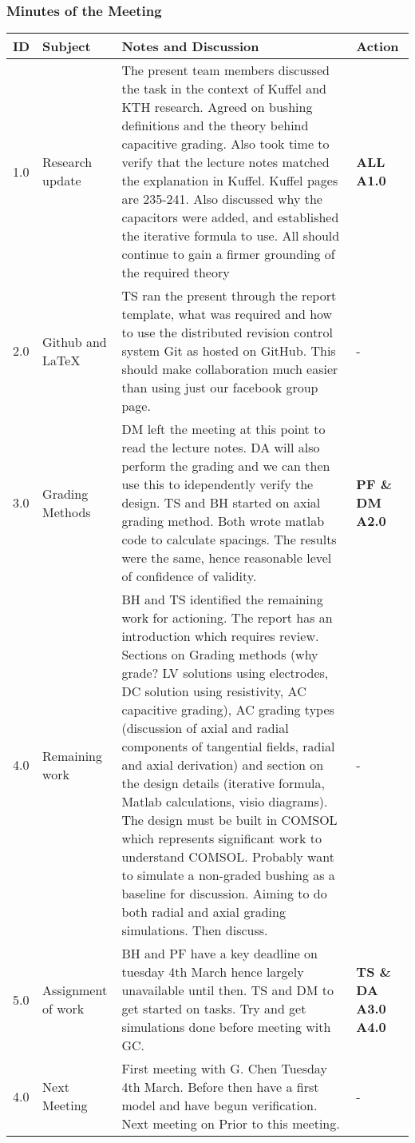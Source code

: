 \subsubsection{Minutes of the Meeting}
\begin{center}
\begin{longtable}{| p{} |>{\raggedright\arraybackslash}p{} | p{} |>{\raggedright\arraybackslash}p{}|} \hline
\textbf{ID} & \textbf{Subject} & \textbf{Notes and Discussion} & \textbf{Action} \\ \hline
\endhead
1.0	&	Research update	&	The present team members discussed the task in the context of Kuffel and KTH research. Agreed on bushing definitions and the theory behind capacitive grading. Also took time to verify that the lecture notes matched the explanation in Kuffel. Kuffel pages are 235-241. Also discussed why the capacitors were added, and established the iterative formula to use. All should continue to gain a firmer grounding of the required theory & \textbf{ALL A1.0}  	 \\ \hline
2.0	&	Github and \LaTeX	&	TS ran the present through the report template, what was required and how to use the distributed revision control system Git as hosted on GitHub. This should make collaboration much easier than using just our facebook group page. 	& -	 \\ \hline
3.0 	& 	Grading Methods &	DM left the meeting at this point to read the lecture notes. DA will also perform the grading and we can then use this to idependently verify the design. TS and BH started on axial grading method. Both wrote matlab code to calculate spacings. The results were the same, hence reasonable level of confidence of validity. & \textbf{PF \& DM A2.0} \\ \hline
4.0	&	Remaining work	& BH and TS identified the remaining work for actioning. The report has an introduction which requires review. Sections on Grading methods (why grade? LV solutions using electrodes, DC solution using resistivity, AC capacitive grading), AC grading types (discussion of axial and radial components of tangential fields, radial and axial derivation) and section on the design details (iterative formula, Matlab calculations, visio diagrams). The design must be built in COMSOL which represents significant work to understand COMSOL. Probably want to simulate a non-graded bushing as a baseline for discussion. Aiming to do both radial and axial grading simulations. Then discuss. & - \\ \hline
5.0	&	Assignment of work	& BH and PF have a key deadline on tuesday 4th March hence largely unavailable until then. TS and DM to get started on tasks. Try and get simulations done before meeting with GC. & \textbf{TS \& DA A3.0 A4.0} \\ \hline
4.0	&	Next Meeting	&	First meeting with G. Chen  Tuesday 4th March. Before then have a first model and have begun verification. Next meeting on Prior to this meeting. & - \\ \hline

\end{longtable}
\end{center}

